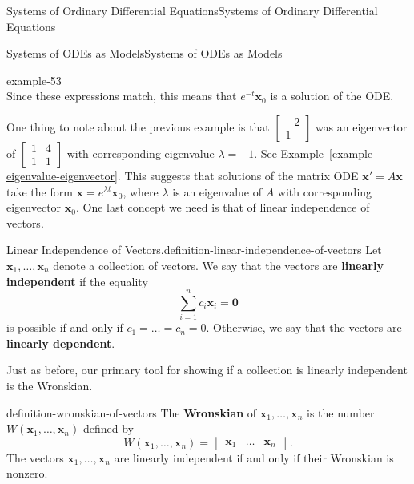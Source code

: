 \documentclass[10pt,]{book}
\newcommand{\terminology}[1]{\textbf{#1}}
\numberwithin{equation}{section}
\renewcommand{\vec}[1]{\mathbf{#1}}
\newcommand{\amp}{&}
\begin{document}
\begin{chapterptx}{Systems of Ordinary Differential Equations}{}{Systems of Ordinary Differential Equations}{}{}
\begin{sectionptx}{Systems of ODEs as Models}{}{Systems of ODEs as Models}{}{}
\begin{example}{}{example-53}
\begin{equation*}
\end{equation*}
Since these expressions match, this means that \(e^{-t}\vec{x}_{0}\) is a solution of the ODE.%
\end{example}
\hypertarget{p-321}{}%
One thing to note about the previous example is that \(\begin{bmatrix}-2\\1\end{bmatrix}\) was an eigenvector of \(\begin{bmatrix}1\amp 4\\1\amp 1\end{bmatrix}\) with corresponding eigenvalue \(\lambda=-1\). See \hyperref[example-eigenvalue-eigenvector]{Example~\ref{example-eigenvalue-eigenvector}}. This suggests that solutions of the matrix ODE \(\vec{x}' = A\vec{x}\) take the form \(\vec{x} = e^{\lambda t}\vec{x}_{0}\), where \(\lambda\) is an eigenvalue of \(A\) with corresponding eigenvector \(\vec{x}_{0}\). One last concept we need is that of linear independence of vectors.%
\begin{definition}{Linear Independence of Vectors.}{definition-linear-independence-of-vectors}%
\hypertarget{p-322}{}%
Let \(\vec{x}_{1},\dots,\vec{x}_{n}\) denote a collection of vectors. We say that the vectors are \terminology{linearly independent} if the equality%
\begin{equation*}
\sum_{i=1}^{n}c_{i}\vec{x}_{i} = \vec{0}
\end{equation*}
is possible if and only if \(c_{1}=\dots=c_{n}=0\). Otherwise, we say that the vectors are \terminology{linearly dependent}.%
\end{definition}
\hypertarget{p-323}{}%
Just as before, our primary tool for showing if a collection is linearly independent is the Wronskian.%
\begin{definition}{}{definition-wronskian-of-vectors}%
\hypertarget{p-324}{}%
The \terminology{Wronskian} of \(\vec{x}_{1},\dots,\vec{x}_{n}\) is the number \(W(\vec{x}_{1},\dots,\vec{x}_{n})\) defined by%
\begin{equation*}
W(\vec{x}_{1},\dots,\vec{x}_{n}) = \begin{vmatrix}\vec{x}_{1}  \amp  \dots   \amp  \vec{x}_{n}\end{vmatrix}.
\end{equation*}
The vectors \(\vec{x}_{1},\dots,\vec{x}_{n}\) are linearly independent if and only if their Wronskian is nonzero.%
\end{definition}

\end{sectionptx}
\end{chapterptx}
\end{document}
